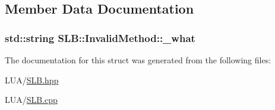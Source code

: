 \subsection{Member Data Documentation}
\subsubsection[{\texorpdfstring{\+\_\+what}{_what}}]{\setlength{\rightskip}{0pt plus 5cm}std\+::string S\+L\+B\+::\+Invalid\+Method\+::\+\_\+what}\hypertarget{structSLB_1_1InvalidMethod_a3fa9d85d93755ecf551aae9daf8a971d}{}\label{structSLB_1_1InvalidMethod_a3fa9d85d93755ecf551aae9daf8a971d}


The documentation for this struct was generated from the following files\+:\begin{DoxyCompactItemize}
\item 
L\+U\+A/\hyperlink{SLB_8hpp}{S\+L\+B.\+hpp}\item 
L\+U\+A/\hyperlink{SLB_8cpp}{S\+L\+B.\+cpp}\end{DoxyCompactItemize}
